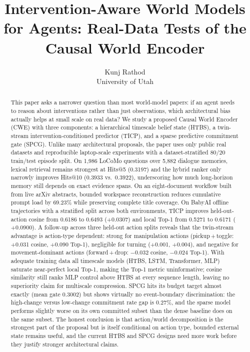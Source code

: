 \documentclass[11pt]{article}
\title{Intervention-Aware World Models for Agents: Real-Data Tests of the Causal World Encoder}
\author{Kunj Rathod\\University of Utah}
\date{}
\begin{document}
\maketitle

\begin{abstract}
This paper asks a narrower question than most world-model papers: if an agent needs to reason about interventions rather than just observations, which architectural bias actually helps at small scale on real data? We study a proposed Causal World Encoder (CWE) with three components: a hierarchical timescale belief state (HTBS), a twin-stream intervention-conditioned predictor (TICP), and a sparse predictive commitment gate (SPCG). Unlike many architectural proposals, the paper uses only public real datasets and reproducible laptop-scale experiments with a dataset-stratified 80/20 train/test episode split. On 1,986 LoCoMo questions over 5,882 dialogue memories, lexical retrieval remains strongest at Hits@5 (0.3197) and the hybrid ranker only narrowly improves Hits@10 (0.3933 vs.\ 0.3922), underscoring how much long-horizon memory still depends on exact evidence spans. On an eight-document workflow built from live arXiv abstracts, bounded workspace reconstruction reduces cumulative prompt load by 69.23\% while preserving complete title coverage. On BabyAI offline trajectories with a stratified split across both environments, TICP improves held-out-action cosine from 0.6186 to 0.6493 ($+$0.0307) and local Top-1 from 0.5271 to 0.6171 ($+$0.0900). A follow-up across three held-out action splits reveals that the twin-stream advantage is action-type dependent: strong for manipulation actions (pickup\,+\,toggle: $+$0.031 cosine, $+$0.090 Top-1), negligible for turning ($+$0.001, $+$0.004), and negative for movement-dominant actions (forward\,+\,drop: $-$0.032 cosine, $-$0.024 Top-1). With adequate training data all timescale models (HTBS, LSTM, Transformer, MLP) saturate near-perfect local Top-1, making the Top-1 metric uninformative; cosine similarity still ranks MLP control above HTBS at every sequence length, leaving no superiority claim for multiscale compression. SPCG hits its budget target almost exactly (mean gate 0.3002) but shows virtually no event-boundary discrimination: the high-change versus low-change commitment rate gap is 0.27\%, and the sparse model performs slightly worse on its own committed subset than the dense baseline does on the same subset. The honest conclusion is that action/world decomposition is the strongest part of the proposal but is itself conditional on action type, bounded external state remains useful, and the current HTBS and SPCG designs need more work before they justify stronger architectural claims.
\end{abstract}
\end{document}
